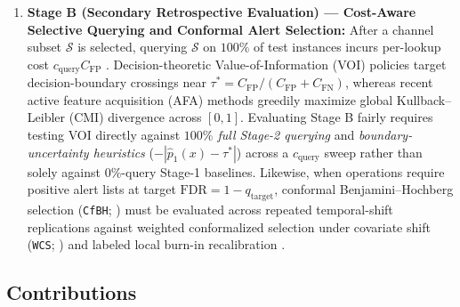 \documentclass[11pt]{article}
\theoremstyle{remark}
\begin{document}
\begin{enumerate}
  \item \textbf{Stage B (Secondary Retrospective Evaluation) --- Cost-Aware Selective Querying and Conformal Alert Selection:} After a channel subset $\mathcal{S}$ is selected, querying $\mathcal{S}$ on $100\%$ of test instances incurs per-lookup cost $c_{\text{query}} C_{\text{FP}}$ \citep{ji2007cost,saartsechansky2009active,bilgic2011value,shim2018joint,vonkleist2025evaluation}. Decision-theoretic Value-of-Information (VOI) policies \citep{ji2007cost,bilgic2011value} target decision-boundary crossings near $\tau^* = C_{\text{FP}}/(C_{\text{FP}} + C_{\text{FN}})$, whereas recent active feature acquisition (AFA) methods \citep{covert2023learning,gadgil2024estimating} greedily maximize global Kullback--Leibler (CMI) divergence across $[0, 1]$. Evaluating Stage B fairly requires testing VOI directly against \emph{$100\%$ full Stage-2 querying} and \emph{boundary-uncertainty heuristics} ($-|\hat{p}_1(x) - \tau^*|$) across a $c_{\text{query}}$ sweep rather than solely against $0\%$-query Stage-1 baselines. Likewise, when operations require positive alert lists at target $\text{FDR} = 1 - q_{\text{target}}$, conformal Benjamini--Hochberg selection (\texttt{CfBH}; \citealp{jin2023selection}) must be evaluated across repeated temporal-shift replications against weighted conformalized selection under covariate shift (\texttt{WCS}; \citealp{jin2025wcs}) and labeled local burn-in recalibration \citep{barber2023conformal}.
\end{enumerate}

\subsection{Contributions}
\end{document}
